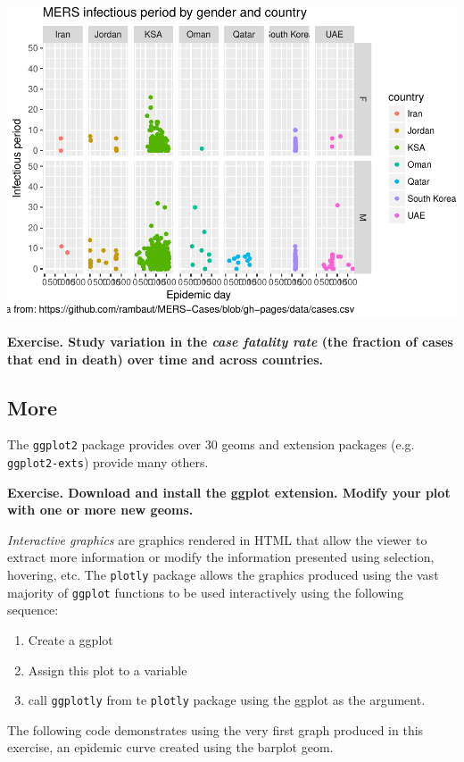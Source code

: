 \documentclass[]{article}
\providecommand{\tightlist}{%
  \setlength{\itemsep}{0pt}\setlength{\parskip}{0pt}}
\begin{document}
\includegraphics{visualization_files/figure-latex/unnamed-chunk-12-1.pdf}

\textbf{Exercise. Study variation in the \emph{case fatality rate} (the
fraction of cases that end in death) over time and across countries.}

\hypertarget{more}{%
\subsection{More}\label{more}}

The \texttt{ggplot2} package provides over 30 geoms and extension
packages (e.g. \texttt{ggplot2-exts}) provide many others.

\textbf{Exercise. Download and install the ggplot extension. Modify your
plot with one or more new geoms.}

\emph{Interactive graphics} are graphics rendered in HTML that allow the
viewer to extract more information or modify the information presented
using selection, hovering, etc. The \texttt{plotly} package allows the
graphics produced using the vast majority of \texttt{ggplot} functions
to be used interactively using the following sequence:

\begin{enumerate}
\def\labelenumi{\arabic{enumi}.}
\tightlist
\item
  Create a ggplot
\item
  Assign this plot to a variable
\item
  call \texttt{ggplotly} from te \texttt{plotly} package using the
  ggplot as the argument.
\end{enumerate}

The following code demonstrates using the very first graph produced in
this exercise, an epidemic curve created using the barplot geom.
\end{document}
